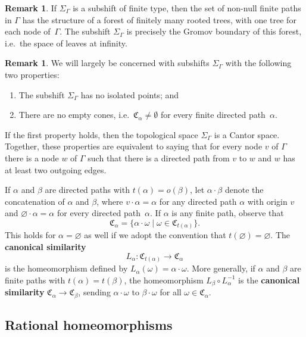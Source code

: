 \documentclass[11pt,letterpaper]{amsart}
\theoremstyle{definition}
\newtheorem{remark}[theorem]{Remark}
\newcommand{\newword}[1]{\textbf{#1}}
\newcommand{\C}{\mathfrak{C}}
\begin{document}
\begin{remark}
If $\Sigma_\Gamma$ is a subshift of finite type, then the set of non-null finite paths in $\Gamma$ has the structure of a forest of finitely many rooted trees, with one tree for each node of~$\Gamma$.  The subshift $\Sigma_\Gamma$ is precisely the Gromov boundary of this forest, i.e.\ the space of leaves at infinity.
\end{remark}

\begin{remark}
We will largely be concerned with subshifts $\Sigma_\Gamma$ with the following two properties:
\begin{enumerate}
    \item The subshift $\Sigma_\Gamma$ has no isolated points; and\smallskip
    \item There are no empty cones, i.e.\ $\C_\alpha\ne\emptyset$ for every finite directed path~$\alpha$.
\end{enumerate}
If the first property holds, then the topological space $\Sigma_\Gamma$ is a Cantor space.  Together, these properties are equivalent to saying that for every node $v$ of $\Gamma$ there is a node $w$ of $\Gamma$ such that there is a directed path from $v$ to $w$ and $w$ has at least two outgoing edges.
\end{remark}

If $\alpha$ and $\beta$ are directed paths with $t(\alpha)=o(\beta)$, let $\alpha\cdot \beta$ denote the concatenation of $\alpha$ and $\beta$, where $v\cdot\alpha=\alpha$ for any directed path $\alpha$ with origin $v$ and $\varnothing \cdot \alpha=\alpha$ for every directed path~$\alpha$. If $\alpha$ is any finite path, observe that
\[
\C_\alpha = \{\alpha\cdot \omega \mid \omega\in \C_{t(\alpha)}\}\text{.}
\]
This holds for $\alpha=\varnothing$ as well if we adopt the convention that $t(\varnothing)=\varnothing$. 
The \newword{canonical similarity}
\[
L_\alpha \colon \C_{t(\alpha)}\to \C_\alpha
\]
is the homeomorphism defined by $L_\alpha(\omega) = \alpha\cdot \omega$.  More generally, if $\alpha$ and $\beta$ are finite paths with $t(\alpha)=t(\beta)$, the homeomorphism $L_\beta\circ L_\alpha^{-1}$ is the \newword{canonical similarity} $\C_\alpha\to \C_\beta$, sending $\alpha\cdot\omega$ to $\beta\cdot\omega$ for all $\omega\in \C_\alpha$.


\subsection{Rational homeomorphisms}\label{ssec:rational}
\end{document}
